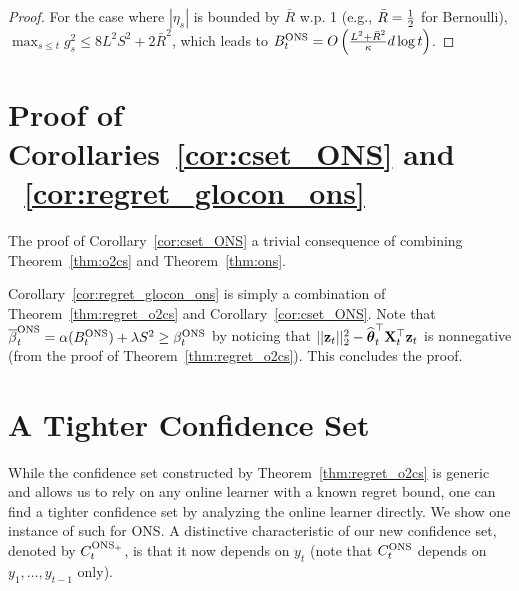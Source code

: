 \begin{proof}
  For the case where $|\eta_s|$ is bounded by $\bar R$ w.p. 1 (e.g., $\bar R={ \frac{1}{2} }$ for Bernoulli), $\max_{s\le t}g_s^2 \le 8L^2 S^2 + 2 \bar{R}^2 $, which leads to $B^{\text{\normalfont ONS}}_t = O\left({ \frac{L^2 + {\bar R}^2}{{\kappa}} }d\log t\right)$. 
\end{proof}

\vspace{-5pt}
\section{Proof of Corollaries~\ref{cor:cset_ONS} and ~\ref{cor:regret_glocon_ons}}
\vspace{-5pt}

The proof of Corollary~\ref{cor:cset_ONS} a trivial consequence of combining Theorem~\ref{thm:o2cs} and Theorem~\ref{thm:ons}.

Corollary~\ref{cor:regret_glocon_ons} is simply a combination of Theorem~\ref{thm:regret_o2cs} and Corollary~\ref{cor:cset_ONS}.
Note that ${\overline{\beta}}^{\text{\normalfont ONS}}_t = \alpha(B^{\text{\normalfont ONS}}_t) + \lambda S^2 \ge \beta^{\text{\normalfont ONS}}_t $ by noticing that $||{{\mathbf z}}_{t}||^2_2 - {{\widehat{\boldsymbol \theta}}}_t^{\top}\mathbf{X}_{t}^{\top} {{\mathbf z}}_{t} $ is nonnegative (from the proof of Theorem~\ref{thm:regret_o2cs}).
This concludes the proof.

\vspace{-5pt}
\section{A Tighter Confidence Set}
\label{sec:supp_tighter}
\vspace{-5pt}

While the confidence set constructed by Theorem~\ref{thm:regret_o2cs} is generic and allows us to rely on any online learner with a known regret bound, one can find a tighter confidence set by analyzing the online learner directly.
We show one instance of such for ONS.
A distinctive characteristic of our new confidence set, denoted by $C^{{\text{\normalfont ONS}}_+}_t$, is that it now depends on $y_t$ (note that $C^{{\text{\normalfont ONS}}}_t$ depends on $y_1,\ldots,y_{t-1}$ only).

